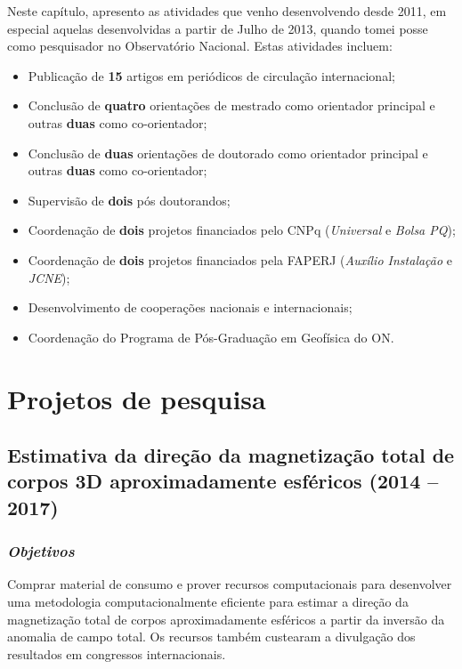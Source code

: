 Neste capítulo, apresento as atividades que venho desenvolvendo desde 2011, 
em especial aquelas desenvolvidas a partir de Julho de 2013, quando tomei 
posse como pesquisador no Observatório Nacional. Estas atividades incluem:
\begin{itemize}
	\item Publicação de \textbf{15} artigos em periódicos de circulação
	internacional;
	\item Conclusão de \textbf{quatro} orientações de mestrado como orientador
	principal e outras \textbf{duas} como co-orientador;
	\item Conclusão de \textbf{duas} orientações de doutorado como orientador 
	principal e outras \textbf{duas} como co-orientador;
	\item Supervisão de \textbf{dois} pós doutorandos;
	\item Coordenação de \textbf{dois} projetos financiados pelo CNPq
	(\textit{Universal} e \textit{Bolsa PQ});
	\item Coordenação de \textbf{dois} projetos financiados pela FAPERJ
	(\textit{Auxílio Instalação} e \textit{JCNE});
	\item Desenvolvimento de cooperações nacionais e internacionais;
	\item Coordenação do Programa de Pós-Graduação em Geofísica do ON.
\end{itemize}



\section{Projetos de pesquisa}


\subsection{Estimativa da direção da magnetização total de corpos 3D aproximadamente esféricos (2014 -- 2017)} \label{projeto-Daiana}

\subsubsection{\emph{Objetivos}}

Comprar material de consumo e prover recursos computacionais para desenvolver 
uma metodologia computacionalmente eficiente para estimar a direção da magnetização 
total de corpos aproximadamente esféricos a partir da inversão da anomalia de campo 
total. Os recursos também custearam a divulgação dos resultados em congressos 
internacionais.

